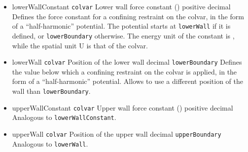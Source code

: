 \begin{itemize}

\item %
  \key
    {lowerWallConstant}{%
    \texttt{colvar}}{%
    Lower wall force constant ()}{%
    positive decimal}{%
    Defines the force constant for a confining restraint on the colvar, in the form of a ``half-harmonic'' potential.
    The potential starts at \texttt{lowerWall} if it is defined, or \texttt{lowerBoundary} otherwise.
    The energy unit of the constant is , while the spatial unit U is that of the colvar.}

\item %
  \keydef
    {lowerWall}{%
    \texttt{colvar}}{%
    Position of the lower wall}{%
    decimal}{%
    \texttt{lowerBoundary}}{%
    Defines the value below which a confining restraint on the colvar is applied, in the form of a ``half-harmonic'' potential.
    Allows to use a different position of the wall than \texttt{lowerBoundary}.}

\item %
  \key
    {upperWallConstant}{%
    \texttt{colvar}}{%
    Upper wall force constant ()}{%
    positive decimal}{%
    Analogous to \texttt{lowerWallConstant}.}

\item %
  \keydef
    {upperWall}{%
    \texttt{colvar}}{%
    Position of the upper wall}{%
    decimal}{%
    \texttt{upperBoundary}}{%
    Analogous to \texttt{lowerWall}.}
\end{itemize}



